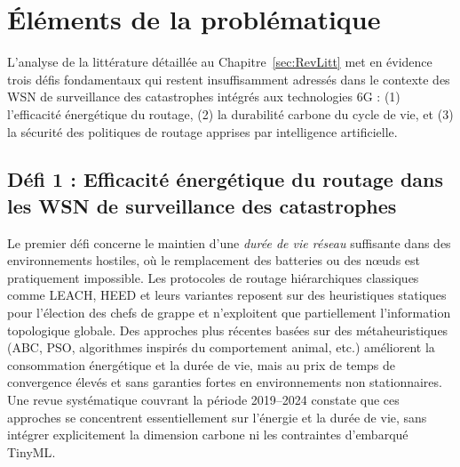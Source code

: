 \section{Éléments de la problématique}\label{sec:Problematique}

L'analyse de la littérature détaillée au Chapitre~\ref{sec:RevLitt} met en évidence trois défis fondamentaux qui restent insuffisamment adressés dans le contexte des WSN de surveillance des catastrophes intégrés aux technologies 6G : (1) l'efficacité énergétique du routage, (2) la durabilité carbone du cycle de vie, et (3) la sécurité des politiques de routage apprises par intelligence artificielle\cite{erdelj2017disaster,freitag2021ict,metaheuristic_wsn_slr2026,alsayyed2025disaster}.

\subsection{Défi 1 : Efficacité énergétique du routage dans les WSN de surveillance des catastrophes}

Le premier défi concerne le maintien d'une \emph{durée de vie réseau} suffisante dans des environnements hostiles, où le remplacement des batteries ou des nœuds est pratiquement impossible. Les protocoles de routage hiérarchiques classiques comme LEACH, HEED et leurs variantes reposent sur des heuristiques statiques pour l'élection des chefs de grappe et n'exploitent que partiellement l'information topologique globale\cite{heinzelman2000leach,heinzelman2002leach,younis2004heed,kumar2012eeleach}. Des approches plus récentes basées sur des métaheuristiques (ABC, PSO, algorithmes inspirés du comportement animal, etc.) améliorent la consommation énergétique et la durée de vie, mais au prix de temps de convergence élevés et sans garanties fortes en environnements non stationnaires\cite{karaboga2005abc,abualigah_swarm_2023,chaurasia_mocraw_2023,elkhediri2024abcaco,dinesh_hbo-sroa_2024}. Une revue systématique couvrant la période 2019--2024 constate que ces approches se concentrent essentiellement sur l'énergie et la durée de vie, sans intégrer explicitement la dimension carbone ni les contraintes d'embarqué TinyML\cite{metaheuristic_wsn_slr2026,tinyml_review_acm2024}.


